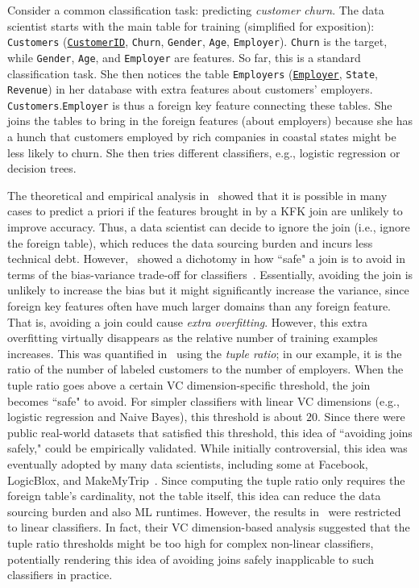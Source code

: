 \documentclass{vldb}
\begin{document}
\vspace{1mm}
Consider a common classification task: predicting \textit{customer 
churn}. The data scientist starts with the main table for training (simplified for exposition): 
\texttt{Customers} (\underline{\texttt{CustomerID}}, \texttt{Churn}, \texttt{Gender}, \texttt{Age}, 
\texttt{Employer}). \texttt{Churn} is the target, while \texttt{Gender}, \texttt{Age}, and
\texttt{Employer} are features. So far, this is a standard classification task. 
She then notices the table \texttt{Employers} (\underline{\texttt{Employer}}, \texttt{State}, 
\texttt{Revenue}) in her database with extra features about customers' employers.
\texttt{Customers}.\texttt{Employer} is thus a foreign key feature connecting these tables. 
She joins the tables to bring in the foreign features (about employers) because she has a hunch that 
customers employed by rich companies in coastal states might be less likely to churn. She then tries 
different classifiers, e.g., logistic regression or decision trees.

The theoretical and empirical analysis in~\cite{hamlet} showed that it is possible in many cases
to predict a priori if the features brought in by a KFK join are unlikely to improve accuracy. Thus,
a data scientist can decide to ignore the join (i.e., ignore the foreign table), which reduces the data
sourcing burden and incurs less technical debt.
However,~\cite{hamlet} showed a dichotomy in how ``safe" a join is to avoid in terms of the bias-variance 
trade-off for classifiers~\cite{hastie,shai}. Essentially, avoiding the join is unlikely to increase 
the bias but it might significantly increase the variance, since foreign key features often have much larger 
domains than any foreign feature. That is, avoiding a join could cause \textit{extra overfitting}.
However, this extra overfitting virtually disappears as the relative number of training examples increases. 
This was quantified in~\cite{hamlet} using the \textit{tuple ratio}; in our example, 
it is the ratio of the number of labeled customers to the number of employers. When the tuple ratio goes
above a certain VC dimension-specific threshold, the join becomes ``safe" to avoid. For simpler classifiers 
with linear VC dimensions (e.g., logistic regression and Naive Bayes), this threshold is about $20$. Since 
there were public real-world datasets that satisfied this threshold, this idea of ``avoiding joins safely," 
could be empirically validated. 
While initially controversial, this idea was eventually adopted by many data scientists, including some at 
Facebook, LogicBlox, and MakeMyTrip~\cite{perscomm}. Since computing the tuple ratio only requires the 
foreign table's cardinality, not the table itself, this idea can reduce the data sourcing burden and also ML 
runtimes. However, the results in~\cite{hamlet} were restricted to linear classifiers. 
In fact, their VC dimension-based analysis suggested that the tuple ratio thresholds might be too high 
for complex non-linear classifiers, potentially rendering this idea of avoiding joins safely inapplicable to 
such classifiers in practice.
\end{document}
